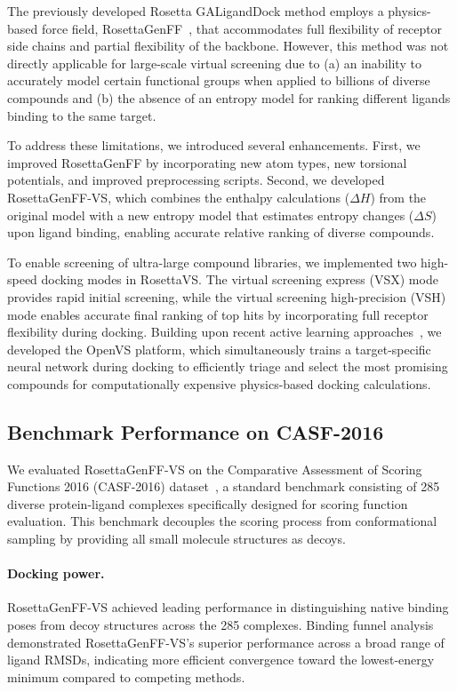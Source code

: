 \documentclass[11pt]{article}
\begin{document}
The previously developed Rosetta GALigandDock method employs a physics-based force field, RosettaGenFF~\citep{park2021force}, that accommodates full flexibility of receptor side chains and partial flexibility of the backbone. However, this method was not directly applicable for large-scale virtual screening due to (a) an inability to accurately model certain functional groups when applied to billions of diverse compounds and (b) the absence of an entropy model for ranking different ligands binding to the same target.

To address these limitations, we introduced several enhancements. First, we improved RosettaGenFF by incorporating new atom types, new torsional potentials, and improved preprocessing scripts. Second, we developed RosettaGenFF-VS, which combines the enthalpy calculations ($\Delta H$) from the original model with a new entropy model that estimates entropy changes ($\Delta S$) upon ligand binding, enabling accurate relative ranking of diverse compounds.

To enable screening of ultra-large compound libraries, we implemented two high-speed docking modes in RosettaVS. The virtual screening express (VSX) mode provides rapid initial screening, while the virtual screening high-precision (VSH) mode enables accurate final ranking of top hits by incorporating full receptor flexibility during docking. Building upon recent active learning approaches~\citep{gentile2020deep,graff2021accelerating}, we developed the OpenVS platform, which simultaneously trains a target-specific neural network during docking to efficiently triage and select the most promising compounds for computationally expensive physics-based docking calculations.

\subsection{Benchmark Performance on CASF-2016}

We evaluated RosettaGenFF-VS on the Comparative Assessment of Scoring Functions 2016 (CASF-2016) dataset~\citep{su2016casf2016}, a standard benchmark consisting of 285 diverse protein-ligand complexes specifically designed for scoring function evaluation. This benchmark decouples the scoring process from conformational sampling by providing all small molecule structures as decoys.

\paragraph{Docking power.} RosettaGenFF-VS achieved leading performance in distinguishing native binding poses from decoy structures across the 285 complexes. Binding funnel analysis demonstrated RosettaGenFF-VS's superior performance across a broad range of ligand RMSDs, indicating more efficient convergence toward the lowest-energy minimum compared to competing methods.
\end{document}
